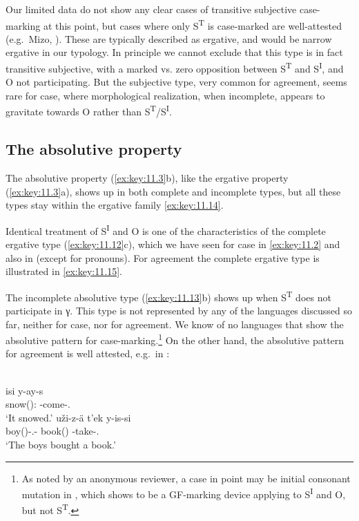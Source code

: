 \documentclass[output=paper]{langsci/langscibook}
\begin{document}
Our limited data do not show any clear cases of transitive subjective
case-marking at this point, but cases where only S\textsuperscript{T} is
case-marked are well-attested (e.g.\ Mizo, \citealt{Chhangte1989}). These are
typically described as ergative, and would be narrow ergative in our typology.
In principle we cannot exclude that this type is in fact transitive subjective,
with a marked vs. zero opposition between S\textsuperscript{T} and
S\textsuperscript{I}, and O not participating. But the subjective type, very
common for agreement, seems rare for case, where morphological realization,
when incomplete, appears to gravitate towards O rather than
S\textsuperscript{T}/S\textsuperscript{I}.

\subsection{The absolutive property}\label{sec:key:11.5.2}

The absolutive property (\ref{ex:key:11.3}b), like the ergative property
(\ref{ex:key:11.3}a), shows up in both complete and incomplete types, but all
these types stay within the ergative family \eqref{ex:key:11.14}.

Identical treatment of S\textsuperscript{I} and O is one of the characteristics
of the complete ergative type (\ref{ex:key:11.12}c), which we have seen for
case in  \eqref{ex:key:11.2} and also in 
(except for pronouns). For agreement the complete ergative type is illustrated
in  \eqref{ex:key:11.15}.

\largerpage[2]
The incomplete absolutive type (\ref{ex:key:11.13}b) shows up when
S\textsuperscript{T} does not participate in γ. This type is not
represented by any of the languages discussed so far, neither for case, nor for
agreement. We know of no languages that show the absolutive pattern for
case-marking.\footnote{As noted by an anonymous reviewer, a case in point may
    be initial consonant mutation in , which
    \parencite[342--343]{Brown2001} shows to be a \gls{GF}-marking device
applying to S\textsuperscript{I} and O, but not S\textsuperscript{T}.} On the
other hand, the absolutive pattern for agreement is well attested, e.g.\ in
 \parencite[344--345]{Polinsky2014}:

\ea%
    \label{ex:key:11.16}  \parencite[345]{Polinsky2014}\\
	\ea
		\gll isi        y-ay-s \\
            snow(\Ii):\Abs{} \Ii-come-\Pst.\Evid{}\\
		\glt ‘It snowed.’
	\ex
		\gll uži-z-ä t’ek y-is-si\\
			boy(\Ig)-\Pl.\Obl-\Erg{}  book(\Ii)  \Ii-take-\Pst.\Evid{}\\
		\glt ‘The boys bought a book.’
	\z
\z
\end{document}
